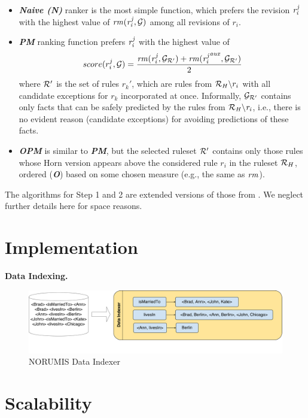 \begin{itemize}
\item {\textbf{\em Naive (N)}} ranker is the most simple function, which prefers the revision $\mathit{r^j_i}$ with the highest value of $\mathit{rm(r^j_{i},\mathcal{G})}$ among all revisions of $r_i$.
\smallskip

\item {\textbf{\em PM}} ranking function prefers $\mathit{r^j_i}$ with the highest value of
\begin{equation}
\label{pm}
score(r^j_i,\mathcal{G})=\dfrac{\mathit{rm(r^j_i,\mathcal{G}_{\mathcal{R}'})+rm({r^j_i}^{aux},\mathcal{G}_{\mathcal{R}'})}}{2}
\end{equation}
 where $\mathcal{R}'$ is the set of rules $r_k'$, which are rules from $\mathcal{R}_H\backslash r_i$ with all candidate exceptions for $r_k$ incorporated at once. Informally, $\mathcal{G}_{\mathcal{R}'}$ contains only facts that can be safely predicted by the rules from $\mathit{\mathcal{R}_H\backslash r_i}$, i.e., there is no evident reason (candidate exceptions) for avoiding predictions of these facts.
 \smallskip
 
\item {\textbf{\em OPM}} is similar to \textbf{{\em PM}}, but the selected ruleset $\mathcal{R}'$ contains only those rules whose Horn version appears above the considered rule $r_i$ in the ruleset $\mathcal{R}_H$, ordered (\textbf{\em O}) based on some chosen measure (e.g., the same as $\mathit{rm}$). 
\end{itemize}

The algorithms for Step 1 and 2 are extended versions of those from \cite{iswc2016}. We neglect further details here for space reasons.

\section{Implementation}

\textbf{Data Indexing.}

\begin{figure}[ht]
\centering
\includegraphics[width=1.0\textwidth]{figures/data_indexing}
\caption{NORUMIS Data Indexer}
\label{system_overview}
\end{figure}

\section{Scalability}